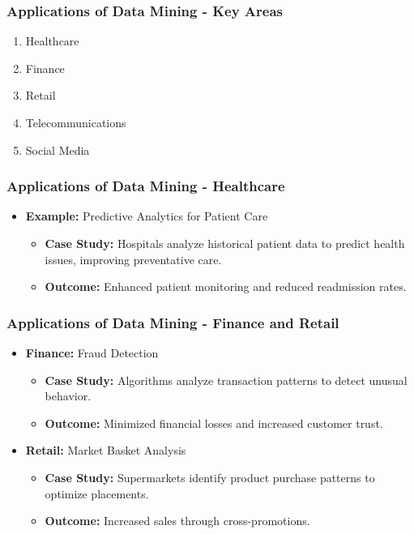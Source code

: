 \documentclass[aspectratio=169]{beamer}
\begin{document}
\begin{frame}[fragile]
    \frametitle{Applications of Data Mining - Key Areas}
    \begin{enumerate}
        \item Healthcare
        \item Finance
        \item Retail
        \item Telecommunications
        \item Social Media
    \end{enumerate}
\end{frame}

\begin{frame}[fragile]
    \frametitle{Applications of Data Mining - Healthcare}
    \begin{itemize}
        \item \textbf{Example:} Predictive Analytics for Patient Care
        \begin{itemize}
            \item \textbf{Case Study:} Hospitals analyze historical patient data to predict health issues, improving preventative care.
            \item \textbf{Outcome:} Enhanced patient monitoring and reduced readmission rates.
        \end{itemize}
    \end{itemize}
\end{frame}

\begin{frame}[fragile]
    \frametitle{Applications of Data Mining - Finance and Retail}
    \begin{itemize}
        \item \textbf{Finance:} Fraud Detection
        \begin{itemize}
            \item \textbf{Case Study:} Algorithms analyze transaction patterns to detect unusual behavior.
            \item \textbf{Outcome:} Minimized financial losses and increased customer trust.
        \end{itemize}
        
        \item \textbf{Retail:} Market Basket Analysis
        \begin{itemize}
            \item \textbf{Case Study:} Supermarkets identify product purchase patterns to optimize placements.
            \item \textbf{Outcome:} Increased sales through cross-promotions.
        \end{itemize}
    \end{itemize}
\end{frame}
\end{document}
